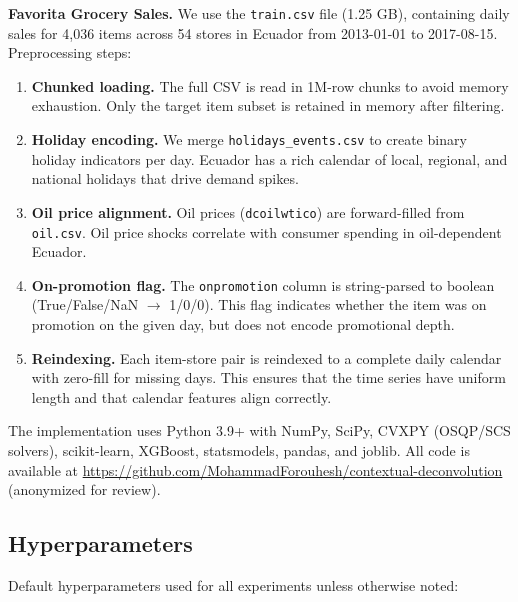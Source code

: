 \documentclass[10pt]{article} %
\theoremstyle{plain}
\theoremstyle{definition}
\begin{document}
\textbf{Favorita Grocery Sales.} We use the \texttt{train.csv} file (1.25 GB), containing daily sales for 4,036 items across 54 stores in Ecuador from 2013-01-01 to 2017-08-15. Preprocessing steps:
\begin{enumerate}
\item \textbf{Chunked loading.} The full CSV is read in 1M-row chunks to avoid memory exhaustion. Only the target item subset is retained in memory after filtering.
\item \textbf{Holiday encoding.} We merge \texttt{holidays\_events.csv} to create binary holiday indicators per day. Ecuador has a rich calendar of local, regional, and national holidays that drive demand spikes.
\item \textbf{Oil price alignment.} Oil prices (\texttt{dcoilwtico}) are forward-filled from \texttt{oil.csv}. Oil price shocks correlate with consumer spending in oil-dependent Ecuador.
\item \textbf{On-promotion flag.} The \texttt{onpromotion} column is string-parsed to boolean (True/False/NaN $\rightarrow$ 1/0/0). This flag indicates whether the item was on promotion on the given day, but does not encode promotional depth.
\item \textbf{Reindexing.} Each item-store pair is reindexed to a complete daily calendar with zero-fill for missing days. This ensures that the time series have uniform length and that calendar features align correctly.
\end{enumerate}


The implementation uses Python 3.9+ with NumPy, SciPy, CVXPY (OSQP/SCS solvers), scikit-learn, XGBoost, statsmodels, pandas, and joblib. All code is available at \url{https://github.com/MohammadForouhesh/contextual-deconvolution} (anonymized for review).


\subsection{Hyperparameters}
\label{app:hyperparameters}

Default hyperparameters used for all experiments unless otherwise noted:
\end{document}
